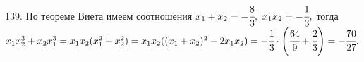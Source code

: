 139. По теореме Виета имеем соотношения $x_1+x_2=-\cfrac{8}{3},\ x_1x_2=-\cfrac{1}{3},$ тогда $x_1x_2^3+x_2x_1^3=x_1x_2(x_1^2+x_2^2)=
x_1x_2((x_1+x_2)^2-2x_1x_2)=-\cfrac{1}{3}\cdot\left(\cfrac{64}{9}+\cfrac{2}{3}\right)=-\cfrac{70}{27}.$\\
